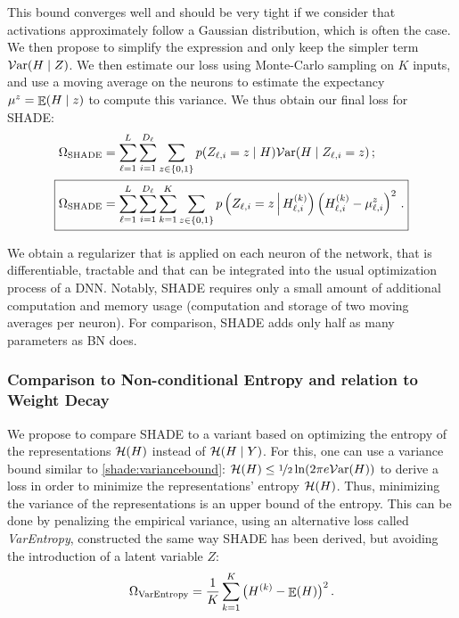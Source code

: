             This bound converges well and should be very tight if we consider that activations approximately follow a Gaussian distribution, which is often the case. We then propose to simplify the expression and only keep the simpler term $\mathcal{V}\mathrm{ar}(H\mid Z)$. We then estimate our loss using Monte-Carlo sampling on $K$ inputs, and use a moving average on the neurons to estimate the expectancy $\mu^z = \mathop{\mathbb{E}}(H\mid z)$ to compute this variance. We thus obtain our final loss for \ac{SHADE}:
            \begin{align}
                \Omega_\mathrm{SHADE} &= \sum_{\ell=1}^{L}\sum_{i=1}^{D_\ell}\sum_{z \in \{0,1\}} p(Z_{\ell,i} = z \mid \Y) \var(\Y\mid Z_{\ell,i}=z)\,; \\
                \Aboxed{
                \Omega_{\mathrm{SHADE}} &= \sum_{\ell=1}^{L}\sum_{i=1}^{D_\ell}\sum_{k=1}^K \sum_{z \in \{0,1\}} p\left(Z_{\ell,i} = z\,\middle|\, \Y_{\ell,i}^{(k)}\right) %
                \left({\Y_{\ell,i}^{(k)}} - \mu_{\ell,i}^ z\right)^2\,.}
            \end{align}
    
    We obtain a regularizer that is applied on each neuron of the network, that is differentiable, tractable and that can be integrated into the usual optimization process of a \ac{DNN}. Notably, \ac{SHADE} requires only a small amount of  additional computation and memory usage (computation and storage of two moving averages per neuron). For comparison, \ac{SHADE} adds only half as many parameters as \acf{BN} does.
    

    \subsubsection*{Comparison to Non-conditional Entropy and relation to Weight Decay}

    We propose to compare \ac{SHADE} to a variant based on optimizing the entropy of the representations $\mathcal{H}(H)$ instead of $\mathcal{H}(H\mid Y)$.
    For this, one can use a variance bound similar to \autoref{shade:variancebound}: $\mathcal{H}(H) \le \nicefrac{1}{2}\ln(2 \pi e \mathcal{V}\mathrm{ar}(H))$ to derive a loss in order to minimize the representations' entropy $\mathcal{H}(H)$. Thus, minimizing the variance of the representations is an upper bound of the entropy. This can be done by penalizing the empirical variance, using an alternative loss called \textit{VarEntropy}, constructed the same way SHADE has been derived, but avoiding the introduction of a latent variable $Z$:
    \begin{equation}
        \label{shade:eq:varreg}
        \Omega_{\mathrm{VarEntropy}} =  \frac{1}{K}\sum_{k=1}^K \big(H^{(k)}- \mathop{\mathbb{E}}(H)\big)^2 \,.
    \end{equation}

